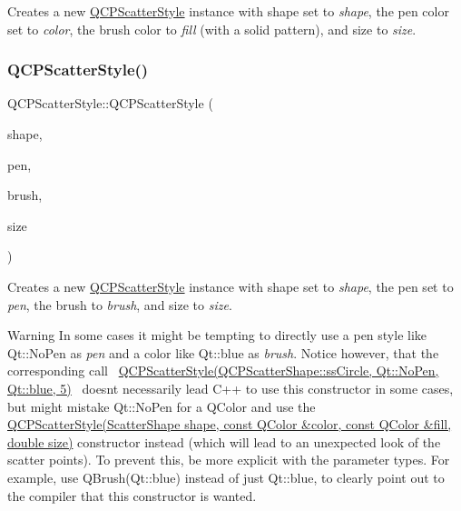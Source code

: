 Creates a new \hyperlink{class_q_c_p_scatter_style}{Q\+C\+P\+Scatter\+Style} instance with shape set to {\itshape shape}, the pen color set to {\itshape color}, the brush color to {\itshape fill} (with a solid pattern), and size to {\itshape size}. \mbox{\label{class_q_c_p_scatter_style_a85acc4941d7e5c9bca5fa51377a77f49}} 
\subsubsection{\texorpdfstring{Q\+C\+P\+Scatter\+Style()}{QCPScatterStyle()}\hspace{0.1cm}{\footnotesize\ttfamily [5/7]}}
{\footnotesize\ttfamily Q\+C\+P\+Scatter\+Style\+::\+Q\+C\+P\+Scatter\+Style (\begin{DoxyParamCaption}\item[{\hyperlink{class_q_c_p_scatter_style_adb31525af6b680e6f1b7472e43859349}{Scatter\+Shape}}]{shape,  }\item[{const Q\+Pen \&}]{pen,  }\item[{const Q\+Brush \&}]{brush,  }\item[{double}]{size }\end{DoxyParamCaption})}

Creates a new \hyperlink{class_q_c_p_scatter_style}{Q\+C\+P\+Scatter\+Style} instance with shape set to {\itshape shape}, the pen set to {\itshape pen}, the brush to {\itshape brush}, and size to {\itshape size}.

\begin{DoxyWarning}{Warning}
In some cases it might be tempting to directly use a pen style like {\ttfamily Qt\+::\+No\+Pen} as {\itshape pen} and a color like {\ttfamily Qt\+::blue} as {\itshape brush}. Notice however, that the corresponding call~\newline
{\ttfamily \hyperlink{class_q_c_p_scatter_style}{Q\+C\+P\+Scatter\+Style(\+Q\+C\+P\+Scatter\+Shape\+::ss\+Circle, Qt\+::\+No\+Pen, Qt\+::blue, 5)}}~\newline
doesn\textquotesingle{}t necessarily lead C++ to use this constructor in some cases, but might mistake {\ttfamily Qt\+::\+No\+Pen} for a Q\+Color and use the \hyperlink{class_q_c_p_scatter_style_a6e1b64f12cac7f07af180ae4316fd38d}{Q\+C\+P\+Scatter\+Style(\+Scatter\+Shape shape, const Q\+Color \&color, const Q\+Color \&fill, double size)} constructor instead (which will lead to an unexpected look of the scatter points). To prevent this, be more explicit with the parameter types. For example, use {\ttfamily Q\+Brush(\+Qt\+::blue)} instead of just {\ttfamily Qt\+::blue}, to clearly point out to the compiler that this constructor is wanted. 
\end{DoxyWarning}
\mbox{\label{class_q_c_p_scatter_style_a63962094587a4c2258435aa7933996cc}} 
